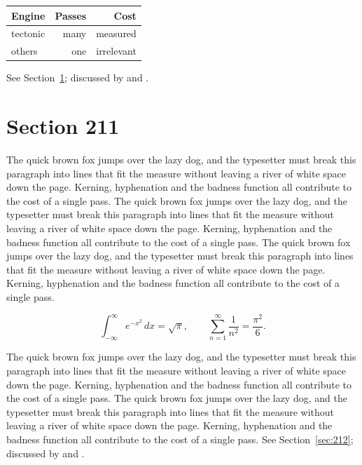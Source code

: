 \documentclass{article}
\begin{document}
\begin{center}
\begin{tabular}{lrr}
\toprule
Engine & Passes & Cost \\
\midrule
tectonic & many & measured \\
others & one & irrelevant \\
\bottomrule
\end{tabular}
\end{center}

See Section~\ref{sec:211}; discussed by \textcite{k1} and \textcite{l3}.
\section{Section 211}
\label{sec:211}
The quick brown fox jumps over the lazy dog, and the typesetter must break this paragraph into lines that fit the measure without leaving a river of white space down the page. Kerning, hyphenation and the badness function all contribute to the cost of a single pass. The quick brown fox jumps over the lazy dog, and the typesetter must break this paragraph into lines that fit the measure without leaving a river of white space down the page. Kerning, hyphenation and the badness function all contribute to the cost of a single pass. The quick brown fox jumps over the lazy dog, and the typesetter must break this paragraph into lines that fit the measure without leaving a river of white space down the page. Kerning, hyphenation and the badness function all contribute to the cost of a single pass. 

\begin{equation}\label{eq:211}
\int_{-\infty}^{\infty} e^{-x^{2}}\,dx = \sqrt{\pi}, \qquad
\sum_{n=1}^{\infty} \frac{1}{n^{2}} = \frac{\pi^{2}}{6}.
\end{equation}

The quick brown fox jumps over the lazy dog, and the typesetter must break this paragraph into lines that fit the measure without leaving a river of white space down the page. Kerning, hyphenation and the badness function all contribute to the cost of a single pass. The quick brown fox jumps over the lazy dog, and the typesetter must break this paragraph into lines that fit the measure without leaving a river of white space down the page. Kerning, hyphenation and the badness function all contribute to the cost of a single pass. 
See Section~\ref{sec:212}; discussed by \textcite{k2} and \textcite{l4}.
\end{document}
